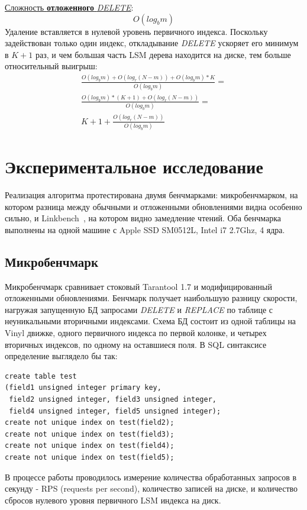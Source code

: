 \documentclass[a4paper,hidelinks,12pt]{article}
\begin{document}
\underline{Сложность \textbf {отложенного} \textit{DELETE}}:
\begin{displaymath}
O(log_bm)
\end{displaymath}
Удаление вставляется в нулевой уровень первичного индекса. Поскольку
задействован только один индекс, откладывание \textit{DELETE} ускоряет его
минимум в $K + 1$ раз, и чем большая часть LSM дерева находится на диске, тем
больше относительный выигрыш:
\begin{gather*}
\frac{O(log_bm) + O(log_r(N-m)) + O(log_bm) * K}{O(log_bm)} = \\
\frac{O(log_bm)*(K + 1) + O(log_r(N-m))}{O(log_bm)} = \\
K + 1 + \frac{O(log_r(N-m))}{O(log_bm)}
\end{gather*}

\section{Экспериментальное исследование}
Реализация алгоритма протестирована двумя бенчмарками: микробенчмарком, на
котором разница между обычными и отложенными обновлениями видна особенно сильно,
и Linkbench~\cite{linkbench}, на котором видно замедление чтений. Оба бенчмарка
выполнены на одной машине с Apple SSD SM0512L, Intel i7 2.7Ghz, 4 ядра.

\subsection{Микробенчмарк}
Микробенчмарк сравнивает стоковый Tarantool 1.7 и модифицированный отложенными
обновлениями. Бенчмарк получает наибольшую разницу скорости, нагружая запущенную
БД запросами \textit{DELETE} и \textit{REPLACE} по таблице с неуникальными
вторичными индексами. Схема БД состоит из одной таблицы на Vinyl движке, одного
первичного индекса по первой колонке, и четырех вторичных индексов, по одному на
оставшиеся поля. В SQL синтаксисе определение выглядело бы так:
\begin{verbatim}
create table test
(field1 unsigned integer primary key,
 field2 unsigned integer, field3 unsigned integer,
 field4 unsigned integer, field5 unsigned integer);
create not unique index on test(field2);
create not unique index on test(field3);
create not unique index on test(field4);
create not unique index on test(field5);
\end{verbatim}

В процессе работы проводилось измерение количества обработанных запросов в
секунду - RPS (requests per second), количество записей на диске, и количество
сбросов нулевого уровня первичного LSM индекса на диск.
\end{document}
